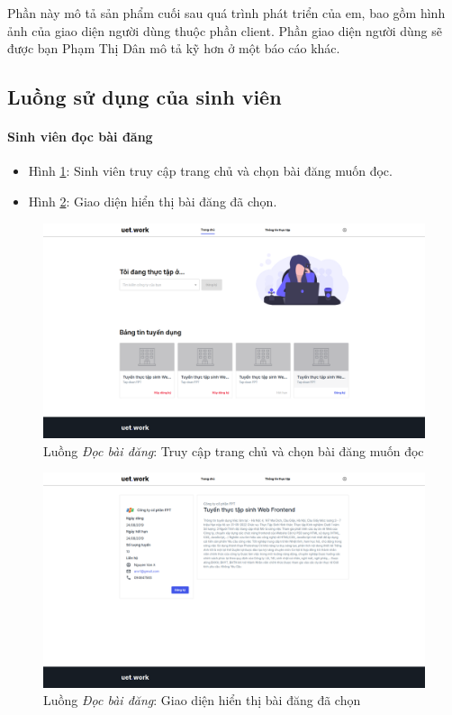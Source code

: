 \documentclass[./../main.tex]{subfiles}
\begin{document}
Phần này mô tả sản phẩm cuối sau quá trình phát triển của em, bao gồm
hình ảnh của giao diện người dùng thuộc phần client. Phần giao diện
người dùng sẽ được bạn Phạm Thị Dân mô tả kỹ hơn ở một báo cáo khác.

\subsection{Luồng sử dụng của sinh viên}

\paragraph*{Sinh viên đọc bài đăng}

\begin{itemize}
\item Hình \ref{fig:student_home_page}: Sinh viên truy cập trang chủ và chọn bài đăng muốn đọc.
\item Hình \ref{fig:student_read_post_page}: Giao diện hiển thị bài đăng đã chọn.
\end{itemize}

\begin{figure}[]
	\includegraphics[width=\linewidth]{./images/image37.png}
	\caption{Luồng \emph{Đọc bài đăng}: Truy cập trang chủ và chọn bài đăng muốn đọc}
	\label{fig:student_home_page}
\end{figure}

\begin{figure}[]
	\includegraphics[width=\linewidth]{./images/image81.png}
	\caption{Luồng \emph{Đọc bài đăng}: Giao diện hiển thị bài đăng đã chọn}
	\label{fig:student_read_post_page}
\end{figure}
\end{document}
